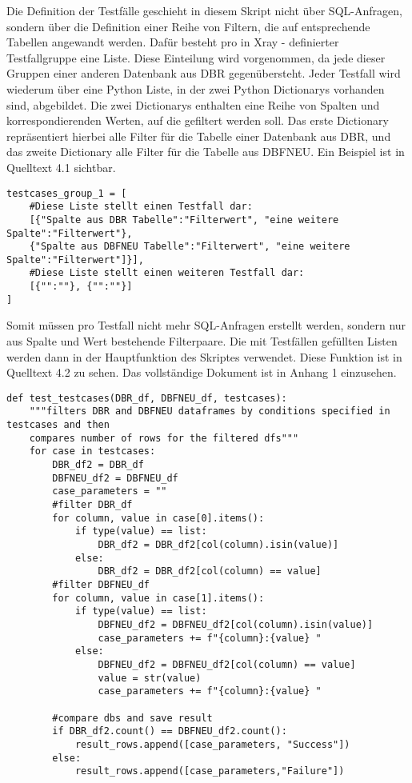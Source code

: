 Die Definition der Testfälle geschieht in diesem Skript nicht über \ac{SQL}-Anfragen, sondern über die Definition einer Reihe von Filtern, die auf entsprechende Tabellen angewandt werden. Dafür besteht pro in Xray - definierter Testfallgruppe eine Liste. Diese Einteilung wird vorgenommen, da jede dieser Gruppen einer anderen Datenbank aus \ac{DBR} gegenübersteht. Jeder Testfall wird wiederum über eine Python Liste, in der zwei Python Dictionarys vorhanden sind, abgebildet. Die zwei Dictionarys enthalten eine Reihe von Spalten und korrespondierenden Werten, auf die gefiltert werden soll. Das erste Dictionary repräsentiert hierbei alle Filter für die Tabelle einer Datenbank aus \ac{DBR}, und das zweite Dictionary alle Filter für die Tabelle aus DBFNEU. Ein Beispiel ist in Quelltext 4.1 sichtbar. 
\begin{lstlisting}[basicstyle=\scriptsize, caption={\texttt{Beispieldefinition von Testfällen}},captionpos=b]
testcases_group_1 = [
	#Diese Liste stellt einen Testfall dar:
	[{"Spalte aus DBR Tabelle":"Filterwert", "eine weitere Spalte":"Filterwert"}, 
	{"Spalte aus DBFNEU Tabelle":"Filterwert", "eine weitere Spalte":"Filterwert"]}], 
	#Diese Liste stellt einen weiteren Testfall dar:
	[{"":""}, {"":""}] 
]
\end{lstlisting}

Somit müssen pro Testfall nicht mehr \ac{SQL}-Anfragen erstellt werden, sondern nur aus Spalte und Wert bestehende Filterpaare.
Die mit Testfällen gefüllten Listen werden dann in der Hauptfunktion des Skriptes verwendet. Diese Funktion ist in Quelltext 4.2 zu sehen. Das vollständige Dokument ist in Anhang 1 einzusehen.


\begin{lstlisting}[basicstyle=\scriptsize, caption={\texttt{Auszug aus Automation.py}},captionpos=b]
def test_testcases(DBR_df, DBFNEU_df, testcases):
	"""filters DBR and DBFNEU dataframes by conditions specified in testcases and then 
	compares number of rows for the filtered dfs"""
	for case in testcases:
		DBR_df2 = DBR_df
		DBFNEU_df2 = DBFNEU_df
		case_parameters = ""
		#filter DBR_df
		for column, value in case[0].items():
			if type(value) == list:
				DBR_df2 = DBR_df2[col(column).isin(value)]
			else:
				DBR_df2 = DBR_df2[col(column) == value]
		#filter DBFNEU_df
		for column, value in case[1].items():
			if type(value) == list:
				DBFNEU_df2 = DBFNEU_df2[col(column).isin(value)]
				case_parameters += f"{column}:{value} "
			else:
				DBFNEU_df2 = DBFNEU_df2[col(column) == value]
				value = str(value)
				case_parameters += f"{column}:{value} "
		
		#compare dbs and save result
		if DBR_df2.count() == DBFNEU_df2.count():
			result_rows.append([case_parameters, "Success"])
		else:
			result_rows.append([case_parameters,"Failure"])
	
\end{lstlisting}

